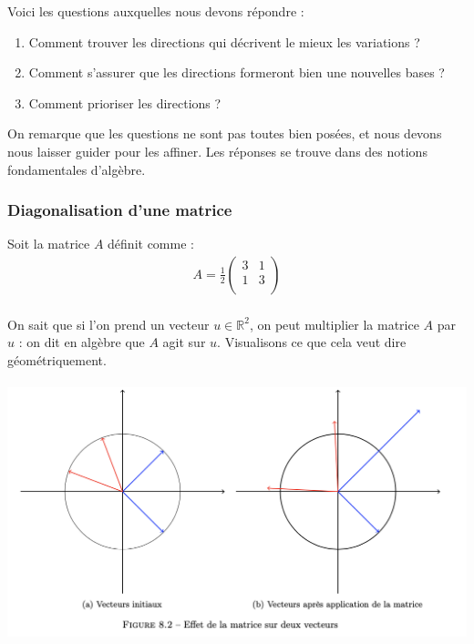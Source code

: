             Voici les questions auxquelles nous devons répondre :
            \begin{enumerate}
                \item Comment trouver les directions qui décrivent le mieux les variations ?
                \item Comment s’assurer que les directions formeront bien une nouvelles bases ? 
                \item Comment prioriser les directions ?
            \end{enumerate}
            On remarque que les questions ne sont pas toutes bien posées, et nous devons nous laisser guider pour les affiner. Les réponses se trouve dans des notions fondamentales d’algèbre.



                \subsubsection*{Diagonalisation d’une matrice}
                    Soit la matrice $A$ définit comme :
                    \\
                    \begin{eqnarray*}
                         A = \frac{1}{2} \left(\begin{array}{cc}3 & 1 \\ 1 & 3\\\end{array}\right)
                    \end{eqnarray*}
                    \\
                    On sait que si l’on prend un vecteur $u \in \mathbb{R}^2$, on peut multiplier la matrice $A$ par $u$ : on dit en algèbre que $A$ agit sur $u$. Visualisons ce que cela veut dire géométriquement.
                    \\
                    \\
                    \includegraphics[width=\linewidth]{./img/reduction_dim/pca/vect_prp}
